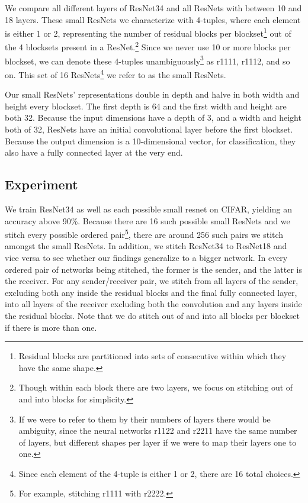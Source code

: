\documentclass{article} %
\begin{document}
We compare all different
layers of ResNet34 and all
ResNets with between 10 and 18 layers. These small ResNets we characterize with 4-tuples, where 
each element is either 1 or 2, representing the number of residual blocks per blockset\footnote{
   Residual blocks are partitioned into sets of consecutive within which they have the same shape.
} out of the 4 blocksets
present in a ResNet.\footnote{
   Though within each block there are two layers,
   we focus on stitching out of and into blocks for simplicity.
} Since we never use 10 or more blocks per blockset, we can denote these 4-tuples unambiguously\footnote{
   If we were to refer to them by their numbers of layers there would be ambiguity, since the neural networks
   r1122 and r2211 have the same number of layers, but different shapes per layer if we were to map their
   layers one to one.
} as
r1111, r1112, and so on. This set of 16 ResNets\footnote{
   Since each element of the 4-tuple is either 1 or 2, there are 16 total choices.
} we refer to as the small ResNets.

Our small ResNets' representations double in depth and halve in both width and height every blockset.
The first depth is 64 and the first width and height
are both 32. Because the input dimensions have a depth of 3, and a width and height both of 32, ResNets have an
initial convolutional layer before the first blockset. Because the output dimension is a 10-dimensional vector,
for classification, they also have a fully connected layer at the very end.

\subsection*{Experiment}
We train ResNet34 as well as each possible small resnet on CIFAR, yielding an accuracy above 90\%. Because 
there are 16 such possible
small ResNets and we stitch every possible ordered pair\footnote{
   For example, stitching r1111 with r2222.
}, there are around 256 such pairs we stitch amongst the small
ResNets. In addition, we stitch ResNet34 to ResNet18 and vice versa to see whether our findings generalize to a
bigger network. In every ordered pair of networks being stitched, the former is the sender, and the latter
is the receiver. For any sender/receiver pair, we stitch from all layers of the sender,
excluding both any inside the residual blocks and the final fully connected layer, into all layers of the receiver
excluding both the convolution and any layers inside the residual blocks. 
Note that we do stitch out of and into all blocks per blockset if there is more than one.
\end{document}

